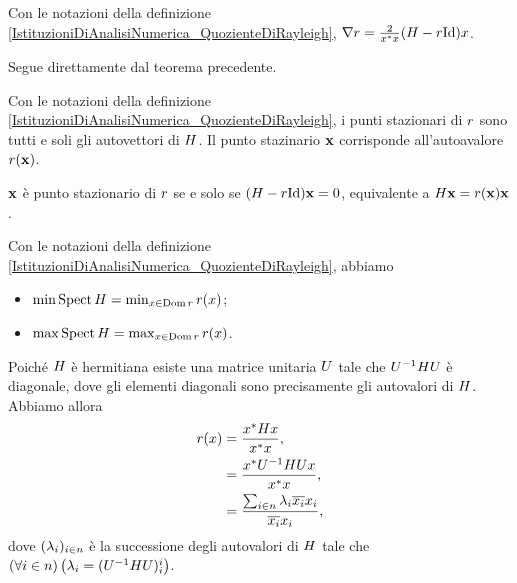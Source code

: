 \begin{Corollary}
	Con le notazioni della definizione \ref{IstituzioniDiAnalisiNumerica_QuozienteDiRayleigh}, $\Gradient{\RayleighQuotient} = \frac{2}{\HermitianTransposed{x}{x}}(\HermitianMatrix - \RayleighQuotient \Identity) x$.
\end{Corollary}
\Proof Segue direttamente dal teorema precedente. \EndProof
\begin{Corollary}
	Con le notazioni della definizione \ref{IstituzioniDiAnalisiNumerica_QuozienteDiRayleigh}, i punti stazionari di $r$ sono tutti e soli gli autovettori di $H$. Il punto stazinario $\Eigenvector$ corrisponde all'autoavalore $\RayleighQuotient(\Eigenvector)$.
\end{Corollary}
\Proof $\Eigenvector$ \`e punto stazionario di $r$ se e solo se $(\HermitianMatrix - \RayleighQuotient \Identity)\Eigenvector = 0$, equivalente a $\HermitianMatrix \Eigenvector =\RayleighQuotient(\Eigenvector) \Eigenvector$. \EndProof
\begin{Corollary}
	Con le notazioni della definizione \ref{IstituzioniDiAnalisiNumerica_QuozienteDiRayleigh}, abbiamo
	\begin{itemize}
		\item $\min \operatorname{Spect}{H} = \min_{x \in \operatorname{Dom}{r}} r(x)$;
		\item $\max \operatorname{Spect}{H} = \max_{x \in \operatorname{Dom}{r}} r(x)$.
	\end{itemize}
\end{Corollary}
\Proof Poich\'e $H$ \`e hermitiana esiste una matrice unitaria $U$ tale che $U^{-1}HU$ \`e diagonale, dove gli elementi diagonali sono precisamente gli autovalori di $H$. Abbiamo allora
\begin{align*}
	r(x)
	&= \frac{{x}^*H x}{{x}^*x}, \\
	&= \frac{{x}^*U^{-1}HU x}{{x}^*x}, \\
	&= \frac{\sum_{i \in n} \lambda_i \overline{x_i}x_i}{\overline{x_i}x_i},
\end{align*}
dove $(\lambda_i)_{i \in n}$ \`e la successione degli autovalori di $H$ tale che $\left ( \forall i \in n \right ) \left ( \lambda_i = (U^{-1}HU)_i^i \right )$.
